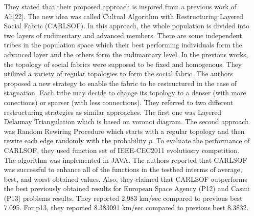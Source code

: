 They stated that their proposed approach is inspired from a previous work of Ali[22]. The new idea was called Cultual Algorithm with Restructuring Layered Social Fabric (CARLSOF). In this approach, the whole population is divided into two layers of rudimentary and advanced members. There are some independent tribes in the population space which their best performing individuals form the advanced layer and the others form the rudimantary level. In the previous works, the topology of social fabrics were supposed to be fixed and homogenous. They utilized a variety of regular topologies to form the social fabric. The authors proposed a new strategy to enable the fabric to be restructured in the case of stagnation. Each tribe may decide to change its topology to a denser (with more conections) or sparser (with less connections). They referred to two different restructuring strategies as similar approaches. The first one was Layered Delaunay Triangulation which is based on voronoi diagram. The second approach was Random Rewiring Procedure which starts with a regular topology and then rewire each edge randomly with the probability $p$. \newline
To evaluate the performance of CARLSOF, they used function set of IEEE-CEC2011 evolutiosry competition. The algorithm was implemented in JAVA. The authors reported that CARLSOF was successful to enhance all of the functions in the testbed interms of average, best, and worst obtained values. Also, they claimed that CARLSOF outperforms the best previously obtained results for European Space Agency (P12) and Casini (P13) problems results. They reported 2.983 km/sec compared to previous best 7.095. For p13, they reported 8.383091 km/sec compared to previous best 8.3832.
